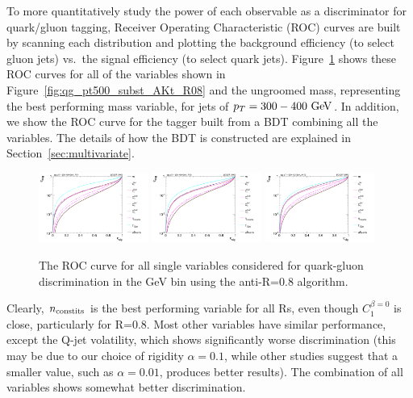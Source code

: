 To more quantitatively study the power of each observable as a
discriminator for quark/gluon tagging, Receiver Operating Characteristic (ROC) curves are built by scanning each distribution
and plotting the background efficiency (to select gluon jets) vs.~the signal efficiency (to select quark jets). 
Figure~\ref{fig:qg_pt300_single} shows these ROC curves for all of the variables shown in 
Figure~\ref{fig:qg_pt500_subst_AKt_R08} and the ungroomed mass, representing the 
best performing mass variable, for jets of $\pt=300-400\GeV$. In addition, we show the ROC curve for 
the tagger built from a BDT combining all the variables. The details of how the BDT is constructed 
are explained in Section~\ref{sec:multivariate}. 
%
\begin{figure}
\begin{center}
\includegraphics[width=0.32\textwidth]{./Figures/QGTagging/pT300/AKtR04/Rocs_1D_single.png}
\includegraphics[width=0.32\textwidth]{./Figures/QGTagging/pT300/AKtR08/Rocs_1D_single.png}
\includegraphics[width=0.32\textwidth]{./Figures/QGTagging/pT300/AKtR12/Rocs_1D_single.png}
\caption{The ROC curve for all single variables considered for quark-gluon discrimination in the  GeV bin using the anti-\kT R=0.8 algorithm.}
\label{fig:qg_pt300_single}
\end{center}
\end{figure}
%
Clearly, $n_{\rm constits}$ is the best performing variable for all Rs, even though $C_1^{\beta=0}$ is close, particularly
for R=0.8. Most other variables have similar performance, except the Q-jet volatility, which shows significantly worse
discrimination (this may be due to our choice of
rigidity $\alpha = 0.1$, while other studies suggest that a smaller value,
such as $\alpha = 0.01$, produces better results). The combination of all variables shows somewhat better discrimination.


